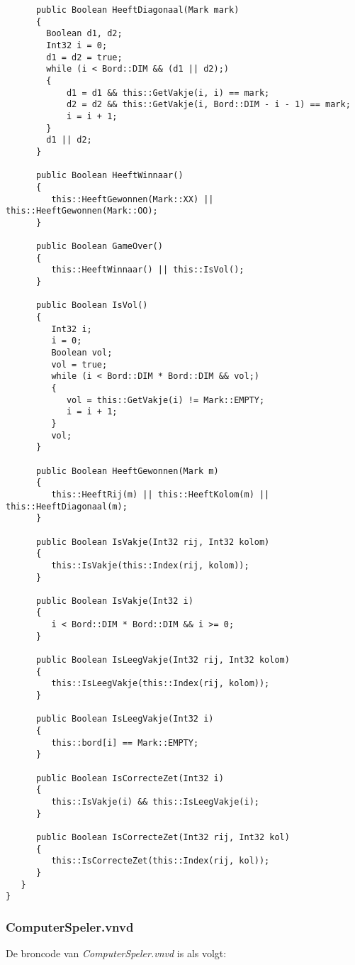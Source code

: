 \begin{lstlisting}
      public Boolean HeeftDiagonaal(Mark mark)
      {
       	Boolean d1, d2;
       	Int32 i = 0;
       	d1 = d2 = true;
       	while (i < Bord::DIM && (d1 || d2);)
       	{
       		d1 = d1 && this::GetVakje(i, i) == mark;
       		d2 = d2 && this::GetVakje(i, Bord::DIM - i - 1) == mark;
       		i = i + 1;
       	}
       	d1 || d2;
      }
      
      public Boolean HeeftWinnaar()
      {
         this::HeeftGewonnen(Mark::XX) || this::HeeftGewonnen(Mark::OO);
      }
      
      public Boolean GameOver()
      {
         this::HeeftWinnaar() || this::IsVol();
      }
      
      public Boolean IsVol()
      {
         Int32 i;
         i = 0;
         Boolean vol;
         vol = true;
         while (i < Bord::DIM * Bord::DIM && vol;)
         {
            vol = this::GetVakje(i) != Mark::EMPTY;
            i = i + 1;
         }
         vol;
      }
      
      public Boolean HeeftGewonnen(Mark m)
      {
         this::HeeftRij(m) || this::HeeftKolom(m) || this::HeeftDiagonaal(m);
      }
      
      public Boolean IsVakje(Int32 rij, Int32 kolom)
      {
         this::IsVakje(this::Index(rij, kolom));
      }
      
      public Boolean IsVakje(Int32 i)
      {
         i < Bord::DIM * Bord::DIM && i >= 0;
      }
      
      public Boolean IsLeegVakje(Int32 rij, Int32 kolom)
      {
         this::IsLeegVakje(this::Index(rij, kolom));
      }
      
      public Boolean IsLeegVakje(Int32 i)
      {
         this::bord[i] == Mark::EMPTY;
      }
      
      public Boolean IsCorrecteZet(Int32 i)
      {
         this::IsVakje(i) && this::IsLeegVakje(i);
      }
      
      public Boolean IsCorrecteZet(Int32 rij, Int32 kol)
      {
         this::IsCorrecteZet(this::Index(rij, kol));
      }
   }
}
\end{lstlisting}

\subsubsection{ComputerSpeler.vnvd}
De broncode van \textit{ComputerSpeler.vnvd} is als volgt:

